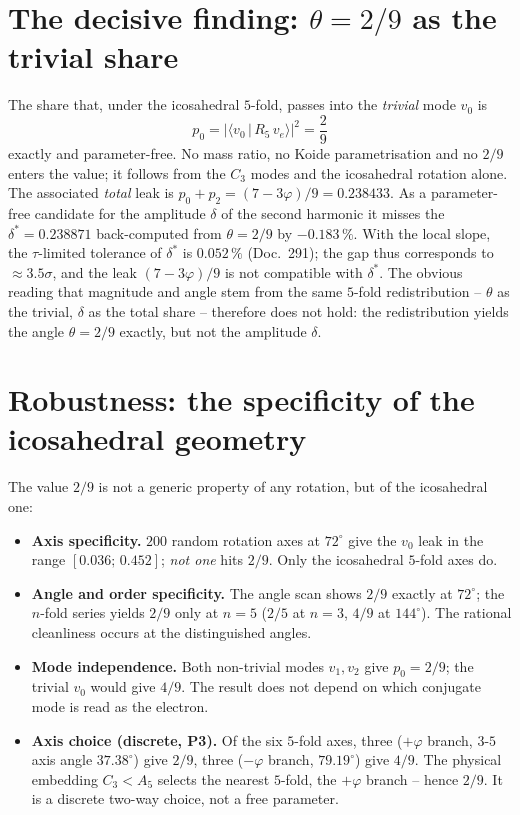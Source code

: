\section{The decisive finding: $\theta=2/9$ as the trivial share}
The share that, under the icosahedral $5$-fold, passes into the \emph{trivial} mode $v_0$ is
\[
\boxed{\;p_0=\big\lvert\langle v_0\,\vert\,R_5\,v_e\rangle\big\rvert^2=\frac{2}{9}\;}
\]
exactly and parameter-free. No mass ratio, no Koide parametrisation and no $2/9$ enters the
value; it follows from the $C_3$ modes and the icosahedral rotation alone. The associated
\emph{total} leak is $p_0+p_2=(7-3\varphi)/9=0.238433$. As a parameter-free candidate for the
amplitude $\delta$ of the second harmonic it misses the $\delta^\ast=0.238871$ back-computed from
$\theta=2/9$ by $-0.183\,\%$. With the local slope, the $\tau$-limited tolerance of $\delta^\ast$ is
$0.052\,\%$ (Doc.~291); the gap thus corresponds to $\approx3.5\sigma$, and the leak $(7-3\varphi)/9$
is not compatible with $\delta^\ast$. The obvious reading that magnitude and angle stem from the
same $5$-fold redistribution -- $\theta$ as the trivial, $\delta$ as the total share -- therefore
does not hold: the redistribution yields the angle $\theta=2/9$ exactly, but not the amplitude
$\delta$.

\section{Robustness: the specificity of the icosahedral geometry}
The value $2/9$ is not a generic property of any rotation, but of the icosahedral one:
\begin{itemize}
\item \textbf{Axis specificity.} $200$ random rotation axes at $72^\circ$ give the $v_0$ leak in
the range $[0.036;\,0.452]$; \emph{not one} hits $2/9$. Only the icosahedral $5$-fold axes do.
\item \textbf{Angle and order specificity.} The angle scan shows $2/9$ exactly at $72^\circ$; the
$n$-fold series yields $2/9$ only at $n=5$ ($2/5$ at $n=3$, $4/9$ at $144^\circ$). The rational
cleanliness occurs at the distinguished angles.
\item \textbf{Mode independence.} Both non-trivial modes $v_1,v_2$ give $p_0=2/9$; the trivial
$v_0$ would give $4/9$. The result does not depend on which conjugate mode is read as the electron.
\item \textbf{Axis choice (discrete, P3).} Of the six $5$-fold axes, three ($+\varphi$ branch,
$3$-$5$ axis angle $37.38^\circ$) give $2/9$, three ($-\varphi$ branch, $79.19^\circ$) give
$4/9$. The physical embedding $C_3<A_5$ selects the nearest $5$-fold, the $+\varphi$ branch --
hence $2/9$. It is a discrete two-way choice, not a free parameter.
\end{itemize}

